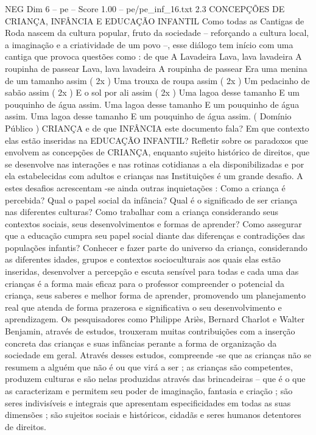 \begin{textsample}{NEG Dim 6 – pe – Score 1.00 – pe/pe\_inf\_16.txt}  \label{ex:f6_neg_038}
2.3 CONCEPÇÕES DE CRIANÇA, INFÂNCIA E EDUCAÇÃO INFANTIL Como todas as Cantigas de Roda nascem da cultura popular, fruto da sociedade – reforçando a cultura local, a imaginação e a criatividade de um povo –, esse diálogo tem início com uma cantiga que provoca questões como : de que A Lavadeira Lava, lava lavadeira A roupinha de passear Lava, lava lavadeira A roupinha de passear Era uma menina de um tamanho assim ( 2x ) Uma trouxa de roupa assim ( 2x ) Um pedacinho de sabão assim ( 2x ) E o sol por ali assim ( 2x ) Uma lagoa desse tamanho E um pouquinho de água assim.
Uma lagoa desse tamanho E um pouquinho de água assim.
Uma lagoa desse tamanho E um pouquinho de água assim. ( Domínio Público ) CRIANÇA e de que INFÂNCIA este documento fala?
Em que contexto elas estão inseridas na EDUCAÇÃO INFANTIL?
Refletir sobre os paradoxos que envolvem as concepções de CRIANÇA, enquanto sujeito histórico de direitos, que se desenvolve nas interações e nas rotinas cotidianas a ela disponibilizadas e por ela estabelecidas com adultos e crianças nas Instituições é um grande desafio.
A estes desafios acrescentam -se ainda outras inquietações : Como a criança é percebida?
Qual o papel social da infância?
Qual é o significado de ser criança nas diferentes culturas?
Como trabalhar com a criança considerando seus contextos sociais, seus desenvolvimentos e formas de aprender?
Como assegurar que a educação cumpra seu papel social diante das diferenças e contradições das populações infantis?
Conhecer e fazer parte do universo da criança, considerando as diferentes idades, grupos e contextos socioculturais aos quais elas estão inseridas, desenvolver a percepção e escuta sensível para todas e cada uma das crianças é a forma mais eficaz para o professor compreender o potencial da criança, seus saberes e melhor forma de aprender, promovendo um planejamento real que atenda de forma prazerosa e significativa o seu desenvolvimento e aprendizagem.
Os pesquisadores como Philippe Ariès, Bernard Charlot e Walter Benjamin, através de estudos, trouxeram muitas contribuições com a inserção concreta das crianças e suas infâncias perante a forma de organização da sociedade em geral.
Através desses estudos, compreende -se que as crianças não se resumem a alguém que não é ou que virá a ser ; as crianças são competentes, produzem culturas e são nelas produzidas através das brincadeiras – que é o que as caracterizam e permitem seu poder de imaginação, fantasia e criação ; são seres indivisíveis e integrais que apresentam especificidades em todas as suas dimensões ; são sujeitos sociais e históricos, cidadãs e seres humanos detentores de direitos.

\end{textsample}
